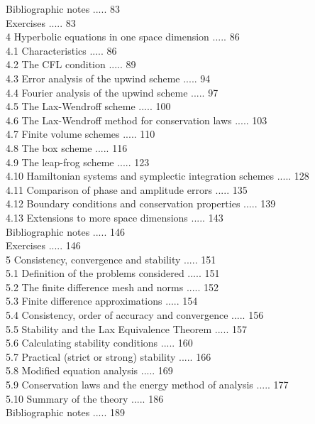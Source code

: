\documentclass[10pt]{article}
\begin{document}
Bibliographic notes ..... 83\\
Exercises ..... 83\\
4 Hyperbolic equations in one space dimension ..... 86\\
4.1 Characteristics ..... 86\\
4.2 The CFL condition ..... 89\\
4.3 Error analysis of the upwind scheme ..... 94\\
4.4 Fourier analysis of the upwind scheme ..... 97\\
4.5 The Lax-Wendroff scheme ..... 100\\
4.6 The Lax-Wendroff method for conservation laws ..... 103\\
4.7 Finite volume schemes ..... 110\\
4.8 The box scheme ..... 116\\
4.9 The leap-frog scheme ..... 123\\
4.10 Hamiltonian systems and symplectic integration schemes ..... 128\\
4.11 Comparison of phase and amplitude errors ..... 135\\
4.12 Boundary conditions and conservation properties ..... 139\\
4.13 Extensions to more space dimensions ..... 143\\
Bibliographic notes ..... 146\\
Exercises ..... 146\\
5 Consistency, convergence and stability ..... 151\\
5.1 Definition of the problems considered ..... 151\\
5.2 The finite difference mesh and norms ..... 152\\
5.3 Finite difference approximations ..... 154\\
5.4 Consistency, order of accuracy and convergence ..... 156\\
5.5 Stability and the Lax Equivalence Theorem ..... 157\\
5.6 Calculating stability conditions ..... 160\\
5.7 Practical (strict or strong) stability ..... 166\\
5.8 Modified equation analysis ..... 169\\
5.9 Conservation laws and the energy method of analysis ..... 177\\
5.10 Summary of the theory ..... 186\\
Bibliographic notes ..... 189\\
\end{document}
